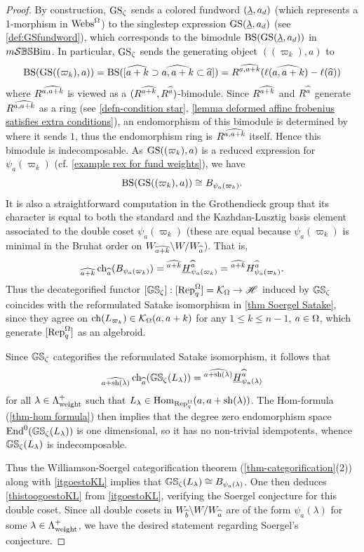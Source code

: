 \begin{proof}
By construction, $\operatorname{GS}_\zeta$ sends a colored fundword $(\underline{\lambda}, a_d)$ (which represents a 1-morphism in $\operatorname{Webs}^{\Omega}$) to the singlestep expression $\operatorname{GS}(\underline{\lambda}, a_d)$ (see \cref{def:GSfundword}), which corresponds to the bimodule $\operatorname{BS}(\operatorname{GS}(\underline{\lambda}, a_d))$ in $m\mathcal{S}\mathbb{BS}\text{Bim}$. In particular, $\operatorname{GS}_\zeta$ sends the generating object $((\varpi_k),a)$ to  
\[ \operatorname{BS}(\operatorname{GS}((\varpi_k),a)) = \operatorname{BS}([\widehat{a+k}\supset \widehat{a, a+k}\subset \widehat{a}]) = R^{\widehat{a,a+k}}(\ell(\widehat{a,a+k})-\ell(\widehat{a})) \]
where $R^{\widehat{a,a+k}}$ is viewed as a $(R^{\widehat{a+k}}, R^{\widehat{a}})$-bimodule. Since $R^{\widehat{a+k}}$ and $R^{\widehat{a}}$ generate $R^{\widehat{a,a+k}}$ as a ring (see \cref{defn-condition star}, \cref{lemma deformed affine frobenius satisfies extra conditions}), an endomorphism of this bimodule is determined by where it sends $1$, thus the endomorphism ring is $R^{\widehat{a,a+k}}$ itself. Hence this bimodule is indecomposable. As $\operatorname{GS}((\varpi_k),a)$ is a reduced expression for $\psi_a(\varpi_k)$ (cf. \cref{example rex for fund weights}), we have
\[ \operatorname{BS}(\operatorname{GS}((\varpi_k),a)) \cong B_{\psi_a(\varpi_k)}.\]
It is also a straightforward computation in the Grothendieck group that its character is equal to both the standard and the Kazhdan-Lusztig basis element associated to the double coset $\psi_a(\varpi_k)$ (these are equal because $\psi_a(\varpi_k)$ is minimal in the Bruhat order on $W_{\widehat{a+k}}\backslash W /W_{\widehat{a}}$). That is,
\[ {}_{\widehat{a+k}}\operatorname{ch}_{\widehat{a}}(B_{\psi_a(\varpi_k)})={}^{\widehat{a+k}}\underline{H}^{\widehat{a}}_{\psi_a(\varpi_k)}={}^{\widehat{a+k}}H^{\widehat{a}}_{\psi_a(\varpi_k)}.\]
Thus the decategorified functor $[\mathbb{GS}_\zeta]:[\operatorname{Rep}_q^{\Omega}]=\mathcal{K}_{\Omega} \rightarrow \mathscr{H}$ induced by $\mathbb{GS}_\zeta$ coincides with the reformulated Satake isomorphism in \cref{thm Soergel Satake}, since they agree on $\operatorname{ch}(L_{\varpi_k}) \in \mathcal{K}_{\Omega}(a,a+k)$ for any $1 \leq k\leq n-1$, $a \in \Omega$, which generate $[\operatorname{Rep}_q^{\Omega}]$ as an algebroid.

Since $\mathbb{GS}_\zeta$ categorifies the reformulated Satake isomorphism, it follows that 
\begin{equation} \label{itgoestoKL} {}_{\widehat{a+\operatorname{sh}(\lambda)}}\operatorname{ch}_{\widehat{a}}(\mathbb{GS}_\zeta(L_\lambda))={}^{\widehat{a+\operatorname{sh}(\lambda)}}\underline{H}^{\widehat{a}}_{\psi_a(\lambda)} \end{equation} for all $\lambda \in \Lambda^+_{\operatorname{weight}}$ such that $L_\lambda \in \operatorname{Hom}_{\operatorname{Rep}_q^{\Omega}}(a, a+\operatorname{sh}(\lambda))$. The Hom-formula (\cref{thm-hom formula}) then implies that the degree zero endomorphism space $\operatorname{End}^0(\mathbb{GS}_\zeta(L_\lambda))$ is one dimensional, so it has no non-trivial idempotents, whence $\mathbb{GS}_\zeta(L_\lambda)$ is indecomposable.

Thus the Williamson-Soergel categorification theorem (\cref{thm-categorification}(2)) along with \cref{itgoestoKL} implies that $\mathbb{GS}_\zeta(L_\lambda) \cong B_{\psi_a(\lambda)}$. One then deduces \eqref{thistoogoestoKL}  from \eqref{itgoestoKL}, verifying the Soergel conjecture for this double coset. Since all double cosets in $W_{\widehat{b}}\backslash W/W_{\widehat{a}}$ are of the form $\psi_a(\lambda)$ for some $\lambda \in \Lambda^+_{\operatorname{weight}}$, we have the desired statement regarding Soergel's conjecture.
\end{proof}

